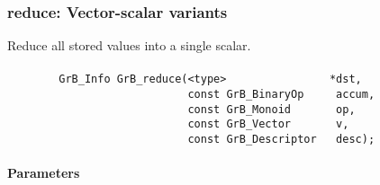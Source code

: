 \subsubsection{{\sf reduce}: Vector-scalar variants}

Reduce all stored values into a single scalar.





\paragraph{\syntax}

\begin{verbatim}
        GrB_Info GrB_reduce(<type>                *dst,
                            const GrB_BinaryOp     accum,
                            const GrB_Monoid       op,
                            const GrB_Vector       v,
                            const GrB_Descriptor   desc);
\end{verbatim}


\paragraph{Parameters}


